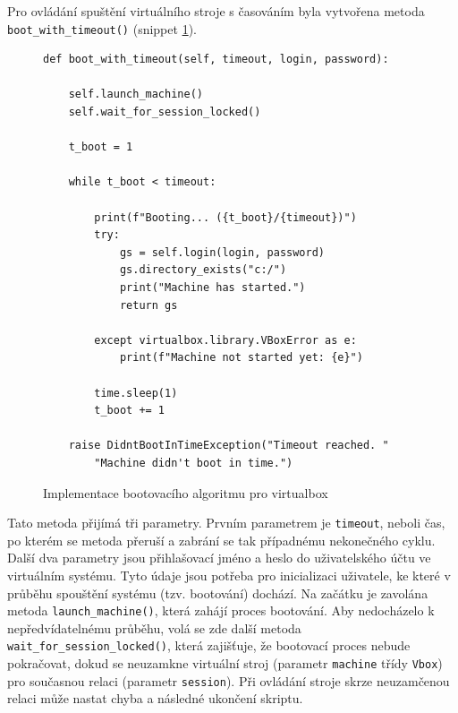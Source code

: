 \documentclass[thesis=M,czech,hidelinks]{FITthesis}[2013/05/06]
\begin{document}
Pro ovládání spuštění virtuálního stroje s časováním byla vytvořena metoda \texttt{boot_with_timeout()} (snippet \ref{snip:vboxboot}). 
\begin{figure}[h]               
	\begin{verbatim}
def boot_with_timeout(self, timeout, login, password):

    self.launch_machine()
    self.wait_for_session_locked()

    t_boot = 1

    while t_boot < timeout:

        print(f"Booting... ({t_boot}/{timeout})")
        try:
            gs = self.login(login, password)
            gs.directory_exists("c:/")
            print("Machine has started.")
            return gs

        except virtualbox.library.VBoxError as e:
            print(f"Machine not started yet: {e}")

        time.sleep(1)
        t_boot += 1

    raise DidntBootInTimeException("Timeout reached. "
        "Machine didn't boot in time.")
	\end{verbatim}      
	\caption{Implementace bootovacího algoritmu pro virtualbox}
	\label{snip:vboxboot}
\end{figure}
Tato metoda přijímá tři parametry. Prvním parametrem je \texttt{timeout}, neboli čas, po kterém se metoda přeruší a zabrání se tak případnému nekonečného cyklu. Další dva parametry jsou přihlašovací jméno a heslo do uživatelského účtu ve virtuálním systému. Tyto údaje jsou potřeba pro inicializaci uživatele, ke které v průběhu spouštění systému (tzv. bootování) dochází. Na začátku je zavolána metoda \texttt{launch_machine()}, která zahájí proces bootování. Aby nedocházelo k nepředvídatelnému průběhu, volá se zde další metoda \texttt{wait_for_session_locked()}, která zajišťuje, že bootovací proces nebude pokračovat, dokud se neuzamkne virtuální stroj (parametr \texttt{machine} třídy \texttt{Vbox}) pro současnou relaci (parametr \texttt{session}). Při ovládání stroje skrze neuzamčenou relaci může nastat chyba a následné ukončení skriptu. 
\end{document}
